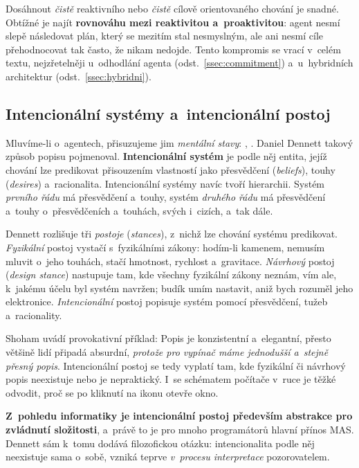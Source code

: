 \documentclass[11pt,a4paper]{article}
\theoremstyle{definition}
\begin{document}
Dosáhnout \emph{čistě} reaktivního nebo \emph{čistě} cílově orientovaného chování je snadné.
Obtížné je najít \textbf{rovnováhu mezi reaktivitou a~proaktivitou}: agent nesmí slepě
následovat plán, který se mezitím stal nesmyslným, ale ani nesmí cíle přehodnocovat tak často,
že nikam nedojde. Tento kompromis se vrací v~celém textu, nejzřetelněji u~odhodlání agenta
(odst.~\ref{ssec:commitment}) a~u~hybridních architektur (odst.~\ref{ssec:hybridni}).

\subsection{Intencionální systémy a~intencionální postoj}

Mluvíme-li o~agentech, přisuzujeme jim \emph{mentální stavy}: ,
. Daniel Dennett takový způsob popisu pojmenoval. \textbf{Intencionální
systém} je podle něj entita, jejíž chování lze predikovat přisouzením vlastností jako
přesvědčení (\emph{beliefs}), touhy (\emph{desires}) a~racionalita. Intencionální systémy navíc
tvoří hierarchii. Systém \emph{prvního řádu} má přesvědčení a~touhy, systém \emph{druhého řádu}
má přesvědčení a~touhy o~přesvědčeních a~touhách, svých i~cizích, a~tak dále.

Dennett rozlišuje tři \emph{postoje} (\emph{stances}), z~nichž lze chování systému predikovat.
\emph{Fyzikální} postoj vystačí s~fyzikálními zákony: hodím-li kamenem, nemusím mluvit o~jeho
touhách, stačí hmotnost, rychlost a~gravitace. \emph{Návrhový} postoj (\emph{design stance})
nastupuje tam, kde všechny fyzikální zákony neznám, vím ale, k~jakému účelu byl systém navržen;
budík umím nastavit, aniž bych rozuměl jeho elektronice. \emph{Intencionální} postoj popisuje
systém pomocí přesvědčení, tužeb a~racionality.

Shoham uvádí provokativní příklad:  Popis je konzistentní a~elegantní, přesto většině lidí připadá absurdní,
\emph{protože pro vypínač máme jednodušší a~stejně přesný popis}. Intencionální postoj se tedy
vyplatí tam, kde fyzikální či návrhový popis neexistuje nebo je nepraktický. I~se schématem
počítače v~ruce je těžké odvodit, proč se po kliknutí na ikonu otevře okno.

\textbf{Z~pohledu informatiky je intencionální postoj především abstrakce pro zvládnutí
složitosti}, a~právě to je pro mnoho programátorů hlavní přínos MAS. Dennett sám k~tomu dodává
filozofickou otázku: intencionalita podle něj neexistuje sama o~sobě, vzniká teprve
\emph{v~procesu interpretace} pozorovatelem.
\end{document}
